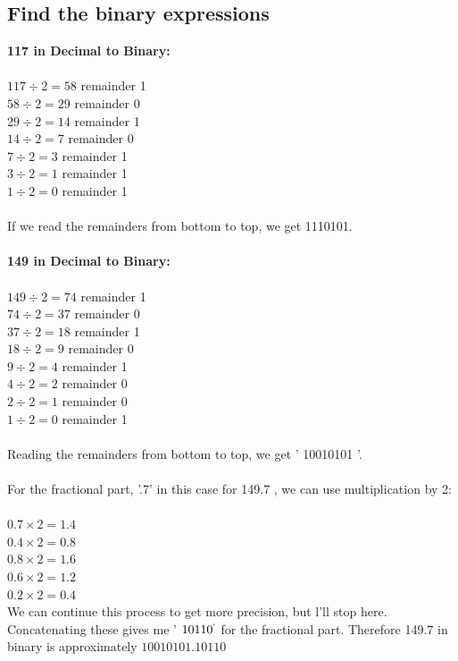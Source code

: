 \documentclass{article}
\begin{document}
\subsection*{Find the binary expressions}
\textbf{117 in Decimal to Binary:}
\\
\\
$117 \div 2=58$ remainder 1
\\
$58 \div 2=29$ remainder 0
\\
$29 \div 2=14$ remainder 1
\\
$14 \div 2=7$ remainder 0
\\
$7 \div 2=3$ remainder 1
\\
$3 \div 2=1$ remainder 1
\\
$1 \div 2=0$ remainder 1
\\
\\
If we read the remainders from bottom to top, we get 1110101.
\\
\\
\textbf{149 in Decimal to Binary:}
\\
\\
$149 \div 2=74$ remainder 1
\\
$74 \div 2=37$ remainder 0
\\
$37 \div 2=18$ remainder 1
\\
$18 \div 2=9$ remainder 0
\\
$9 \div 2=4$ remainder 1
\\
$4 \div 2=2$ remainder 0
\\
$2 \div 2=1$ remainder 0
\\
$1 \div 2=0$ remainder 1
\\
\\
Reading the remainders from bottom to top, we get ' 10010101 '.
\\
\\
For the fractional part, '.7' in this case for 149.7 , we can use multiplication by 2:
\\
\\
$0.7 \times 2=1.4$ 
\\
$0.4 \times 2=0.8$ 
\\
$0.8 \times 2=1.6$
\\
$0.6 \times 2=1.2$
\\
$0.2 \times 2=0.4$
\\
We can continue this process to get more precision, but l'll stop here. Concatenating these gives me ' $10110{ }^`$ for the fractional part.
Therefore 149.7 in binary is approximately $10010101.10110$
\end{document}
